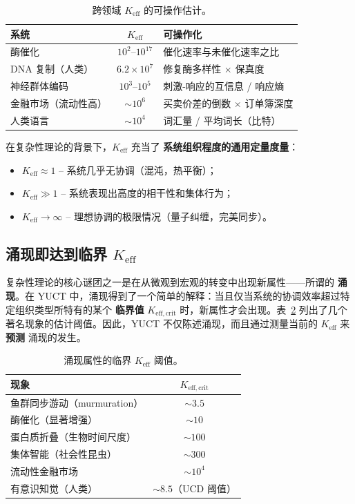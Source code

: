 \documentclass[11pt]{article}
\theoremstyle{remark}
\newcommand{\Keff}{K_{\mathrm{eff}}}
\newcommand{\Keffcrit}{K_{\mathrm{eff},\text{crit}}}
\begin{document}
	\begin{table}[H]
		\centering
		\caption{跨领域 \(\Keff\) 的可操作估计。}
		\label{tab:keff_examples}
		\begin{tabular}{l c l}
			\toprule
			\textbf{系统} & \(\Keff\) & \textbf{可操作化} \\
			\midrule
			酶催化 & \(10^2\)–\(10^{17}\) & 催化速率与未催化速率之比 \\
			DNA 复制（人类） & \(6.2\times10^7\) & 修复酶多样性 \(\times\) 保真度 \\
			神经群体编码 & \(10^3\)–\(10^5\) & 刺激-响应的互信息 / 响应熵 \\
			金融市场（流动性高） & \(\sim 10^6\) & 买卖价差的倒数 \(\times\) 订单簿深度 \\
			人类语言 & \(\sim 10^4\) & 词汇量 / 平均词长（比特） \\
			\bottomrule
		\end{tabular}
	\end{table}
	
	在复杂性理论的背景下，\(\Keff\) 充当了 \textbf{系统组织程度的通用定量度量}：
	\begin{itemize}
		\item \(\Keff \approx 1\) – 系统几乎无协调（混沌，热平衡）；
		\item \(\Keff \gg 1\) – 系统表现出高度的相干性和集体行为；
		\item \(\Keff \to \infty\) – 理想协调的极限情况（量子纠缠，完美同步）。
	\end{itemize}
	
	\subsection{涌现即达到临界 \(\Keff\)}
	
	复杂性理论的核心谜团之一是在从微观到宏观的转变中出现新属性——所谓的 \textbf{涌现}。在 YUCT 中，涌现得到了一个简单的解释：当且仅当系统的协调效率超过特定组织类型所特有的某个 \textbf{临界值} \(\Keffcrit\) 时，新属性才会出现。表~\ref{tab:thresholds} 列出了几个著名现象的估计阈值。因此，YUCT 不仅陈述涌现，而且通过测量当前的 \(\Keff\) 来 \textbf{预测} 涌现的发生。
	
	\begin{table}[H]
		\centering
		\caption{涌现属性的临界 \(\Keff\) 阈值。}
		\label{tab:thresholds}
		\begin{tabular}{l c}
			\toprule
			\textbf{现象} & \(\Keffcrit\) \\
			\midrule
			鱼群同步游动（murmuration） & \(\sim 3.5\) \\
			酶催化（显著增强） & \(\sim 10\) \\
			蛋白质折叠（生物时间尺度） & \(\sim 100\) \\
			集体智能（社会性昆虫） & \(\sim 300\) \\
			流动性金融市场 & \(\sim 10^4\) \\
			有意识知觉（人类） & \(\sim 8.5\)（UCD 阈值） \\
			\bottomrule
		\end{tabular}
	\end{table}
	
\end{document}
